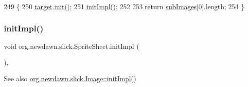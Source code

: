 \begin{DoxyCode}
249                                   \{
250         \mbox{\hyperlink{classorg_1_1newdawn_1_1slick_1_1_sprite_sheet_a54e0b09e9140db02bc11ac22fff5d464}{target}}.\mbox{\hyperlink{classorg_1_1newdawn_1_1slick_1_1_image_a94d180c9218ba1444a0496a1898ec345}{init}}();
251         \mbox{\hyperlink{classorg_1_1newdawn_1_1slick_1_1_sprite_sheet_a66be61bdff9a452f365abe95d2b47da2}{initImpl}}();
252         
253         \textcolor{keywordflow}{return} \mbox{\hyperlink{classorg_1_1newdawn_1_1slick_1_1_sprite_sheet_a4aa6be08aecfbd439794ca984ce6e44c}{subImages}}[0].length;
254     \}
\end{DoxyCode}
\mbox{\label{classorg_1_1newdawn_1_1slick_1_1_sprite_sheet_a66be61bdff9a452f365abe95d2b47da2}} 
\subsubsection{\texorpdfstring{init\+Impl()}{initImpl()}}
{\footnotesize\ttfamily void org.\+newdawn.\+slick.\+Sprite\+Sheet.\+init\+Impl (\begin{DoxyParamCaption}{ }\end{DoxyParamCaption})\hspace{0.3cm}{\ttfamily [inline]}, {\ttfamily [protected]}}

\begin{DoxySeeAlso}{See also}
\mbox{\hyperlink{classorg_1_1newdawn_1_1slick_1_1_image_afc518253119ab1acad5e36b486e2f3f4}{org.\+newdawn.\+slick.\+Image\+::init\+Impl()}} 
\end{DoxySeeAlso}

